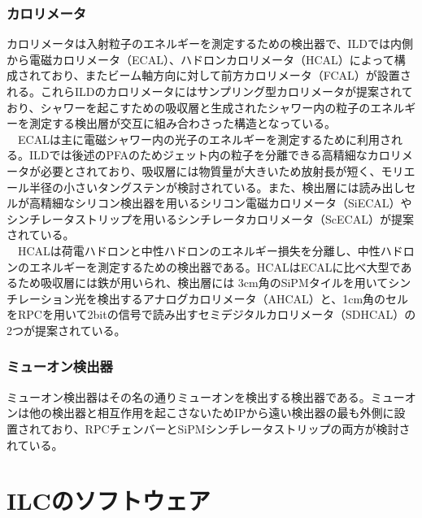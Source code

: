 \subsubsection{カロリメータ}
カロリメータは入射粒子のエネルギーを測定するための検出器で、ILDでは内側から電磁カロリメータ（ECAL）、ハドロンカロリメータ（HCAL）によって構成されており、またビーム軸方向に対して前方カロリメータ（FCAL）が設置される。これらILDのカロリメータにはサンプリング型カロリメータが提案されており、シャワーを起こすための吸収層と生成されたシャワー内の粒子のエネルギーを測定する検出層が交互に組み合わさった構造となっている。\\
　ECALは主に電磁シャワー内の光子のエネルギーを測定するために利用される。ILDでは後述のPFAのためジェット内の粒子を分離できる高精細なカロリメータが必要とされており、吸収層には物質量が大きいため放射長が短く、モリエール半径の小さいタングステンが検討されている。また、検出層には読み出しセルが高精細なシリコン検出器を用いるシリコン電磁カロリメータ（SiECAL）やシンチレータストリップを用いるシンチレータカロリメータ（ScECAL）が提案されている。\\
　HCALは荷電ハドロンと中性ハドロンのエネルギー損失を分離し、中性ハドロンのエネルギーを測定するための検出器である。HCALはECALに比べ大型であるため吸収層には鉄が用いられ、検出層には 3cm角のSiPMタイルを用いてシンチレーション光を検出するアナログカロリメータ（AHCAL）と、1cm角のセルをRPCを用いて2bitの信号で読み出すセミデジタルカロリメータ（SDHCAL）の2つが提案されている。
\subsubsection{ミューオン検出器}
ミューオン検出器はその名の通りミューオンを検出する検出器である。ミューオンは他の検出器と相互作用を起こさないためIPから遠い検出器の最も外側に設置されており、RPCチェンバーとSiPMシンチレータストリップの両方が検討されている。

\section{ILCのソフトウェア}
